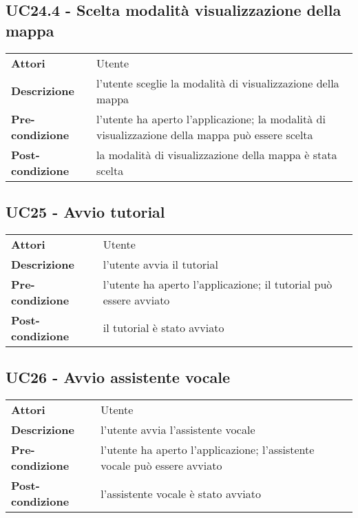 \subsection{UC24.4 - Scelta modalità visualizzazione della mappa}
\label{sssec:UC24.4}
\def\arraystretch{1.5}
\begin{tabularx}{\textwidth}{l|p{}}
\rowcolor{I} \multicolumn{2}{c}{\color{white}\textbf{UC24.4 - Scelta modalità visualizzazione della mappa}} \\
\toprule
\endhead
\textbf{Attori} & Utente\\
\textbf{Descrizione} & l'utente sceglie la modalità di visualizzazione della mappa\\
\textbf{Pre-condizione} & l'utente ha aperto l'applicazione; la modalità di visualizzazione della mappa può essere scelta\\
\textbf{Post-condizione} & la modalità di visualizzazione della mappa è stata scelta\\
\bottomrule
\end{tabularx}
\subsection{UC25 - Avvio tutorial}
\label{sssec:UC25}
\def\arraystretch{1.5}
\begin{tabularx}{\textwidth}{l|p{}}
\rowcolor{I} \multicolumn{2}{c}{\color{white}\textbf{UC25 - Avvio tutorial}} \\
\toprule
\endhead
\textbf{Attori} & Utente\\
\textbf{Descrizione} & l'utente avvia il tutorial\\
\textbf{Pre-condizione} & l'utente ha aperto l'applicazione; il tutorial può essere avviato\\
\textbf{Post-condizione} & il tutorial è stato avviato\\
\bottomrule
\end{tabularx}
\subsection{UC26 - Avvio assistente vocale}
\label{sssec:UC26}
\def\arraystretch{1.5}
\begin{tabularx}{\textwidth}{l|p{}}
\rowcolor{I} \multicolumn{2}{c}{\color{white}\textbf{UC26 - Avvio assistente vocale}} \\
\toprule
\endhead
\textbf{Attori} & Utente\\
\textbf{Descrizione} & l'utente avvia l'assistente vocale\\
\textbf{Pre-condizione} & l'utente ha aperto l'applicazione; l'assistente vocale può essere avviato\\
\textbf{Post-condizione} & l'assistente vocale è stato avviato\\
\bottomrule
\end{tabularx}
